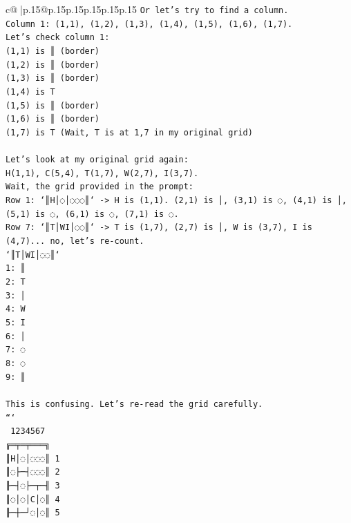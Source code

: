 \documentclass{article}
\begin{document}
{\begin{supertabular}{c@{$\;$}|p{.15\linewidth}@{}p{.15\linewidth}p{.15\linewidth}p{.15\linewidth}p{.15\linewidth}p{.15\linewidth}}
{{{\texttt{Or let's try to find a column.} \\
\texttt{Column 1: (1,1), (1,2), (1,3), (1,4), (1,5), (1,6), (1,7).} \\
\texttt{Let's check column 1:} \\
\texttt{(1,1) is ║ (border)} \\
\texttt{(1,2) is ║ (border)} \\
\texttt{(1,3) is ║ (border)} \\
\texttt{(1,4) is T} \\
\texttt{(1,5) is ║ (border)} \\
\texttt{(1,6) is ║ (border)} \\
\texttt{(1,7) is T (Wait, T is at 1,7 in my original grid)} \\
\\ 
\texttt{Let's look at my original grid again:} \\
\texttt{H(1,1), C(5,4), T(1,7), W(2,7), I(3,7).} \\
\texttt{Wait, the grid provided in the prompt:} \\
\texttt{Row 1: `║H│◌│◌◌◌║` {-}> H is (1,1). (2,1) is │, (3,1) is ◌, (4,1) is │, (5,1) is ◌, (6,1) is ◌, (7,1) is ◌.} \\
\texttt{Row 7: `║T│WI│◌◌║` {-}> T is (1,7), (2,7) is │, W is (3,7), I is (4,7)... no, let's re{-}count.} \\
\texttt{`║T│WI│◌◌║`} \\
\texttt{1: ║} \\
\texttt{2: T} \\
\texttt{3: │} \\
\texttt{4: W} \\
\texttt{5: I} \\
\texttt{6: │} \\
\texttt{7: ◌} \\
\texttt{8: ◌} \\
\texttt{9: ║} \\
\\ 
\texttt{This is confusing. Let's re{-}read the grid carefully.} \\
\texttt{```} \\
\texttt{ 1234567} \\
\texttt{╔═╤═╤═══╗} \\
\texttt{║H│◌│◌◌◌║ 1} \\
\texttt{║◌├─┤◌◌◌║ 2} \\
\texttt{╟─┤◌├─┬─╢ 3} \\
\texttt{║◌│◌│C│◌║ 4} \\
\texttt{╟─┼─┘◌│◌║ 5} \\
}}}
\end{supertabular}}
\end{document}
